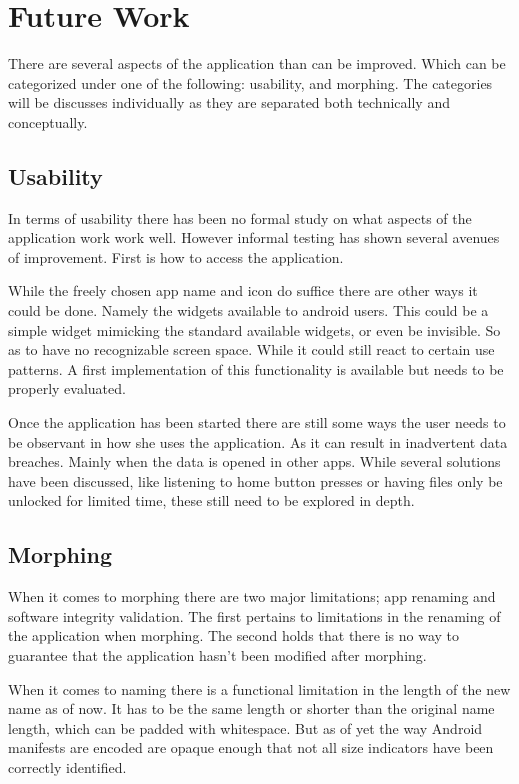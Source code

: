 \section{Future Work}
\label{sec:future-work}

There are several aspects of the application than can be improved. Which
can be categorized under one of the following: usability, and morphing.
The categories will be discusses individually as they are separated both
technically and conceptually. 

\subsection{Usability}

In terms of usability there has been no formal study on what aspects of
the application work work well. However informal testing has shown several
avenues of improvement. First is how to access the application. 

While the freely chosen app name and icon do suffice there are other ways 
it could be done. Namely the widgets available to android users. This could 
be a simple widget mimicking the standard available widgets, or even be 
invisible. So as to have no recognizable screen space. While it could still
react to certain use patterns. A first implementation of this functionality is
available but needs to be properly evaluated.

Once the application has been started there are still some ways the user
needs to be observant in how she uses the application. As it can result in
inadvertent data breaches. Mainly when the data is opened in other apps.
While several solutions have been discussed, like listening to home button
presses or having files only be unlocked for limited time, these still need
to be explored in depth.

\subsection{Morphing} 
\label{sec:limitations:morphing}

When it comes to morphing there are two major limitations; app renaming and software integrity validation. 
The first pertains to limitations in the renaming of the application when morphing. 
The second holds that there is no way to guarantee that the application hasn't been modified after morphing.

When it comes to naming there is a functional limitation in the length of the new name as of now.
It has to be the same length or shorter than the original name length, which can be padded with whitespace. 
But as of yet the way Android manifests are encoded are opaque enough that not all size indicators have been correctly identified.

